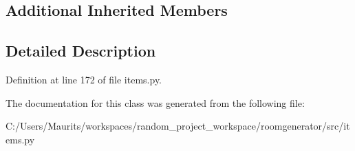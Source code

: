 \subsection*{Additional Inherited Members}


\subsection{Detailed Description}


Definition at line 172 of file items.\+py.



The documentation for this class was generated from the following file\+:\begin{DoxyCompactItemize}
\item 
C\+:/\+Users/\+Maurits/workspaces/random\+\_\+project\+\_\+workspace/roomgenerator/src/items.\+py\end{DoxyCompactItemize}
